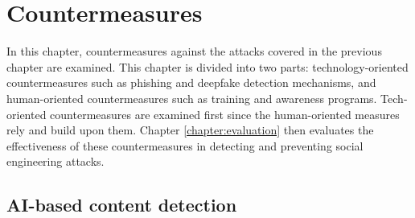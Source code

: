 


\chapter{Countermeasures\label{chapter:countermeasures}}

\begin{comment}

Guides:
    - 

TODO:
    [ ] 

What to cover:
    - AI monitoring content and informing the user if something they are about to share could be used against them or their organization?
    - AI generated training content suited to the personality of the user
    - Policies and EU etc regulations about the development of AI tech

\end{comment}

In this chapter, countermeasures against the attacks covered in the previous chapter are examined. This chapter is divided into two parts: technology-oriented countermeasures such as phishing and deepfake detection mechanisms, and human-oriented countermeasures such as training and awareness programs. Tech-oriented countermeasures are examined first since the human-oriented measures rely and build upon them. Chapter \ref{chapter:evaluation} then evaluates the effectiveness of these countermeasures in detecting and preventing social engineering attacks.















\section{AI-based content detection}

\begin{comment}

AI-generated content detection

What to cover:
    - Deepfake content detection
    - Spear phishing detection
        - Also spear phishing that is written by humans (thus the title can't be AI-generated content detection?)

    
\end{comment}


